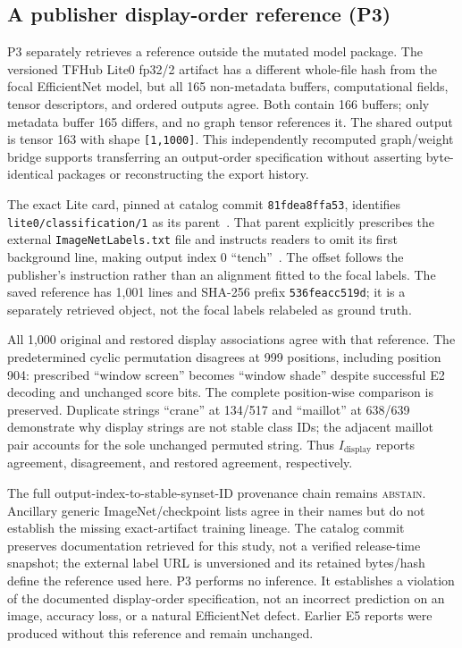 \documentclass[10pt,twocolumn,letterpaper]{article}
\newcommand{\code}[1]{\texttt{#1}}
\begin{document}
\subsection{A publisher display-order reference (P3)}
\label{sec:p3}
P3 separately retrieves a reference outside the mutated model package. The versioned TFHub Lite0 fp32/2 artifact has a different whole-file hash from the focal EfficientNet model, but all 165 non-metadata buffers, computational fields, tensor descriptors, and ordered outputs agree. Both contain 166 buffers; only metadata buffer 165 differs, and no graph tensor references it. The shared output is tensor 163 with shape \code{[1,1000]}. This independently recomputed graph/weight bridge supports transferring an output-order specification without asserting byte-identical packages or reconstructing the export history.

The exact Lite card, pinned at catalog commit \code{81fdea8ffa53}, identifies \code{lite0/classification/1} as its parent~\cite{tfhub-lite-card}. That parent explicitly prescribes the external \code{ImageNetLabels.txt} file and instructs readers to omit its first background line, making output index 0 ``tench''~\cite{tfhub-parent-card,imagenet-display}. The offset follows the publisher's instruction rather than an alignment fitted to the focal labels. The saved reference has 1,001 lines and SHA-256 prefix \code{536feacc519d}; it is a separately retrieved object, not the focal labels relabeled as ground truth.

All 1,000 original and restored display associations agree with that reference. The predetermined cyclic permutation disagrees at 999 positions, including position 904: prescribed ``window screen'' becomes ``window shade'' despite successful E2 decoding and unchanged score bits. The complete position-wise comparison is preserved. Duplicate strings ``crane'' at 134/517 and ``maillot'' at 638/639 demonstrate why display strings are not stable class IDs; the adjacent maillot pair accounts for the sole unchanged permuted string. Thus $I_{\mathrm{display}}$ reports agreement, disagreement, and restored agreement, respectively.

The full output-index-to-stable-synset-ID provenance chain remains \textsc{abstain}. Ancillary generic ImageNet/checkpoint lists agree in their names but do not establish the missing exact-artifact training lineage. The catalog commit preserves documentation retrieved for this study, not a verified release-time snapshot; the external label URL is unversioned and its retained bytes/hash define the reference used here. P3 performs no inference. It establishes a violation of the documented display-order specification, not an incorrect prediction on an image, accuracy loss, or a natural EfficientNet defect. Earlier E5 reports were produced without this reference and remain unchanged.
\end{document}
